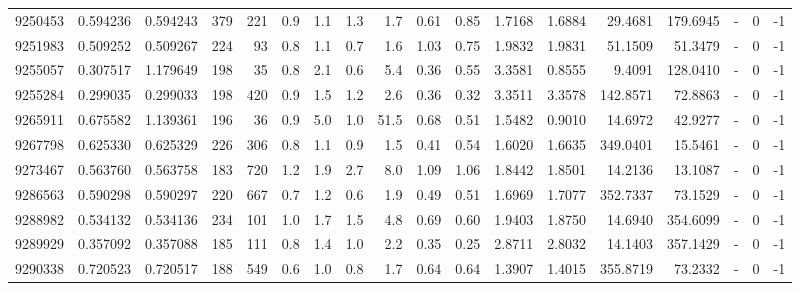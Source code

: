 \begin{tabular}{rrrrrrrrrrrrrrrlrr}
   9250453 & 0.594236 &   0.594243 &  379 &  221 &      0.9 &      1.1 &     1.3 &      1.7 &       0.61 &        0.85 &  1.7168 &  1.6884 &   29.4681 &  179.6945 &             - &        0 &         -1 \\
   9251983 & 0.509252 &   0.509267 &  224 &   93 &      0.8 &      1.1 &     0.7 &      1.6 &       1.03 &        0.75 &  1.9832 &  1.9831 &   51.1509 &   51.3479 &             - &        0 &         -1 \\
   9255057 & 0.307517 &   1.179649 &  198 &   35 &      0.8 &      2.1 &     0.6 &      5.4 &       0.36 &        0.55 &  3.3581 &  0.8555 &    9.4091 &  128.0410 &             - &        0 &         -1 \\
   9255284 & 0.299035 &   0.299033 &  198 &  420 &      0.9 &      1.5 &     1.2 &      2.6 &       0.36 &        0.32 &  3.3511 &  3.3578 &  142.8571 &   72.8863 &             - &        0 &         -1 \\
   9265911 & 0.675582 &   1.139361 &  196 &   36 &      0.9 &      5.0 &     1.0 &     51.5 &       0.68 &        0.51 &  1.5482 &  0.9010 &   14.6972 &   42.9277 &             - &        0 &         -1 \\
   9267798 & 0.625330 &   0.625329 &  226 &  306 &      0.8 &      1.1 &     0.9 &      1.5 &       0.41 &        0.54 &  1.6020 &  1.6635 &  349.0401 &   15.5461 &             - &        0 &         -1 \\
   9273467 & 0.563760 &   0.563758 &  183 &  720 &      1.2 &      1.9 &     2.7 &      8.0 &       1.09 &        1.06 &  1.8442 &  1.8501 &   14.2136 &   13.1087 &             - &        0 &         -1 \\
   9286563 & 0.590298 &   0.590297 &  220 &  667 &      0.7 &      1.2 &     0.6 &      1.9 &       0.49 &        0.51 &  1.6969 &  1.7077 &  352.7337 &   73.1529 &             - &        0 &         -1 \\
   9288982 & 0.534132 &   0.534136 &  234 &  101 &      1.0 &      1.7 &     1.5 &      4.8 &       0.69 &        0.60 &  1.9403 &  1.8750 &   14.6940 &  354.6099 &             - &        0 &         -1 \\
   9289929 & 0.357092 &   0.357088 &  185 &  111 &      0.8 &      1.4 &     1.0 &      2.2 &       0.35 &        0.25 &  2.8711 &  2.8032 &   14.1403 &  357.1429 &             - &        0 &         -1 \\
   9290338 & 0.720523 &   0.720517 &  188 &  549 &      0.6 &      1.0 &     0.8 &      1.7 &       0.64 &        0.64 &  1.3907 &  1.4015 &  355.8719 &   73.2332 &             - &        0 &         -1 \\

\end{tabular}
